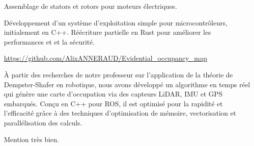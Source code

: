 \documentclass[10pt,a4paper,ragged2e,withhyper]{../AltaCV/altacv}
\begin{document}
\begin{paracol}{2}
  Assemblage de stators et rotors pour moteurs électriques.

  \smallskip


    Développement d'un système d'exploitation simple pour microcontrôleurs, initialement en C++.
    Réécriture partielle en Rust pour améliorer les performances et et la sécurité.

  \divider

  {\url{https://github.com/AlixANNERAUD/Evidential_occupancy_map}}
  {}
  {}

  À partir des recherches de notre professeur sur l’application de la théorie de Dempster-Shafer en robotique, nous avons développé un algorithme en temps réel qui génère une carte d'occupation via des capteurs LiDAR, IMU et GPS embarqués.
  Conçu en C++ pour ROS, il est optimisé pour la rapidité et l’efficacité grâce à des techniques d'optimisation de mémoire, vectorisation et parallélisation des calculs.

  \medskip

  \switchcolumn



  \divider

  Mention très bien.

  \divider


  \smallskip



  \divider


  \divider




\end{paracol}
\end{document}
